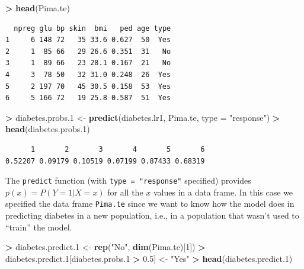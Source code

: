 \documentclass[
]{krantz}
\makeatletter
\newenvironment{Shaded}{\begin{snugshade}}{\end{snugshade}}
\newcommand{\DataTypeTok}[1]{\textcolor[rgb]{0.27,0.27,0.27}{#1}}
\newcommand{\DecValTok}[1]{\textcolor[rgb]{0.06,0.06,0.06}{#1}}
\newcommand{\FloatTok}[1]{\textcolor[rgb]{0.06,0.06,0.06}{#1}}
\newcommand{\KeywordTok}[1]{\textcolor[rgb]{0.27,0.27,0.27}{\textbf{#1}}}
\newcommand{\NormalTok}[1]{#1}
\newcommand{\OperatorTok}[1]{\textcolor[rgb]{0.43,0.43,0.43}{\textbf{#1}}}
\newcommand{\StringTok}[1]{\textcolor[rgb]{0.5,0.5,0.5}{#1}}
\newenvironment{kframe}{%
\medskip{}
\setlength{\fboxsep}{.8em}
 \def\at@end@of@kframe{}%
 \ifinner\ifhmode%
  \def\at@end@of@kframe{\end{minipage}}%
  \begin{minipage}{\columnwidth}%
 \fi\fi%
 \def\FrameCommand##1{\hskip\@totalleftmargin \hskip-\fboxsep
 \colorbox{shadecolor}{##1}\hskip-\fboxsep
     \hskip-\linewidth \hskip-\@totalleftmargin \hskip\columnwidth}%
 \MakeFramed {\advance\hsize-\width
   \@totalleftmargin\z@ \linewidth\hsize
   \@setminipage}}%
 {\par\unskip\endMakeFramed%
 \at@end@of@kframe}
\renewenvironment{Shaded}{\begin{kframe}}{\end{kframe}}
\makeatother
\begin{document}
\begin{Shaded}
\begin{Highlighting}[]
\OperatorTok{\textgreater{}}\StringTok{ }\KeywordTok{head}\NormalTok{(Pima.te)}
\end{Highlighting}
\end{Shaded}

\begin{verbatim}
  npreg glu bp skin  bmi   ped age type
1     6 148 72   35 33.6 0.627  50  Yes
2     1  85 66   29 26.6 0.351  31   No
3     1  89 66   23 28.1 0.167  21   No
4     3  78 50   32 31.0 0.248  26  Yes
5     2 197 70   45 30.5 0.158  53  Yes
6     5 166 72   19 25.8 0.587  51  Yes
\end{verbatim}

\begin{Shaded}
\begin{Highlighting}[]
\OperatorTok{\textgreater{}}\StringTok{ }\NormalTok{diabetes.probs}\FloatTok{.1}\NormalTok{ \textless{}{-}}\StringTok{ }\KeywordTok{predict}\NormalTok{(diabetes.lr1, Pima.te, }\DataTypeTok{type =} \StringTok{"response"}\NormalTok{)}
\OperatorTok{\textgreater{}}\StringTok{ }\KeywordTok{head}\NormalTok{(diabetes.probs}\FloatTok{.1}\NormalTok{)}
\end{Highlighting}
\end{Shaded}

\begin{verbatim}
      1       2       3       4       5       6 
0.52207 0.09179 0.10519 0.07199 0.87433 0.68319 
\end{verbatim}

The \texttt{predict} function (with \texttt{type\ =\ "response"} specified) provides \(p(x) = P(Y = 1 | X = x)\) for all the \(x\) values in a data frame. In this case we specified the data frame \texttt{Pima.te} since we want to know how the model does in predicting diabetes in a new population, i.e., in a population that wasn't used to ``train'' the model.

\begin{Shaded}
\begin{Highlighting}[]
\OperatorTok{\textgreater{}}\StringTok{ }\NormalTok{diabetes.predict}\FloatTok{.1}\NormalTok{ \textless{}{-}}\StringTok{ }\KeywordTok{rep}\NormalTok{(}\StringTok{"No"}\NormalTok{, }\KeywordTok{dim}\NormalTok{(Pima.te)[}\DecValTok{1}\NormalTok{])}
\OperatorTok{\textgreater{}}\StringTok{ }\NormalTok{diabetes.predict}\FloatTok{.1}\NormalTok{[diabetes.probs}\FloatTok{.1} \OperatorTok{\textgreater{}}\StringTok{ }\FloatTok{0.5}\NormalTok{] \textless{}{-}}\StringTok{ "Yes"}
\OperatorTok{\textgreater{}}\StringTok{ }\KeywordTok{head}\NormalTok{(diabetes.predict}\FloatTok{.1}\NormalTok{)}
\end{Highlighting}
\end{Shaded}
\end{document}
